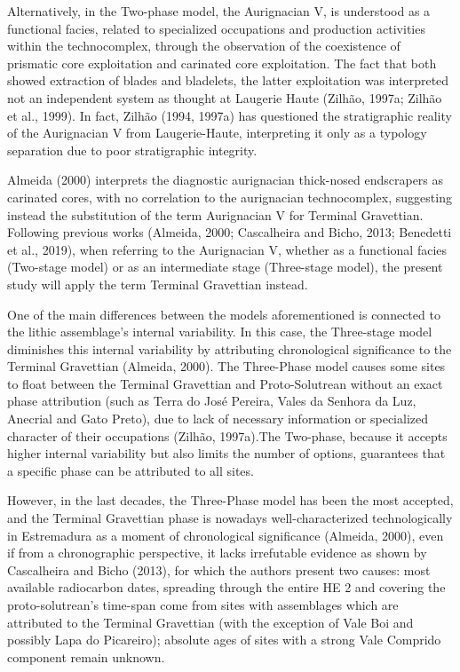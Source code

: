 \documentclass[12pt,twoside]{reedthesis}
\begin{document}
Alternatively, in the Two-phase model, the Aurignacian V, is understood as a functional facies, related to specialized occupations and production activities within the technocomplex, through the observation of the coexistence of prismatic core exploitation and carinated core exploitation. The fact that both showed extraction of blades and bladelets, the latter exploitation was interpreted not an independent system as thought at Laugerie Haute (Zilhão, 1997a; Zilhão et al., 1999). In fact, Zilhão (1994, 1997a) has questioned the stratigraphic reality of the Aurignacian V from Laugerie-Haute, interpreting it only as a typology separation due to poor stratigraphic integrity.

Almeida (2000) interprets the diagnostic aurignacian thick-nosed endscrapers as carinated cores, with no correlation to the aurignacian technocomplex, suggesting instead the substitution of the term Aurignacian V for Terminal Gravettian. Following previous works (Almeida, 2000; Cascalheira and Bicho, 2013; Benedetti et al., 2019), when referring to the Aurignacian V, whether as a functional facies (Two-stage model) or as an intermediate stage (Three-stage model), the present study will apply the term Terminal Gravettian instead.

One of the main differences between the models aforementioned is connected to the lithic assemblage's internal variability. In this case, the Three-stage model diminishes this internal variability by attributing chronological significance to the Terminal Gravettian (Almeida, 2000). The Three-Phase model causes some sites to float between the Terminal Gravettian and Proto-Solutrean without an exact phase attribution (such as Terra do José Pereira, Vales da Senhora da Luz, Anecrial and Gato Preto), due to lack of necessary information or specialized character of their occupations (Zilhão, 1997a).The Two-phase, because it accepts higher internal variability but also limits the number of options, guarantees that a specific phase can be attributed to all sites.

However, in the last decades, the Three-Phase model has been the most accepted, and the Terminal Gravettian phase is nowadays well-characterized technologically in Estremadura as a moment of chronological significance (Almeida, 2000), even if from a chronographic perspective, it lacks irrefutable evidence as shown by Cascalheira and Bicho (2013), for which the authors present two causes: most available radiocarbon dates, spreading through the entire HE 2 and covering the proto-solutrean's time-span come from sites with assemblages which are attributed to the Terminal Gravettian (with the exception of Vale Boi and possibly Lapa do Picareiro); absolute ages of sites with a strong Vale Comprido component remain unknown.
\end{document}
